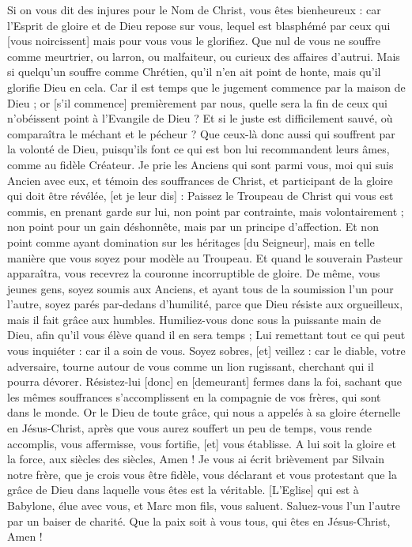 \begin{multicols}{2}
Si on vous dit des injures pour le Nom de Christ, vous êtes bienheureux : car l'Esprit de gloire et de Dieu repose sur vous, lequel est blasphémé par ceux qui [vous noircissent] mais pour vous vous le glorifiez.
Que nul de vous ne souffre comme meurtrier, ou larron, ou malfaiteur, ou curieux des affaires d'autrui.
Mais si quelqu'un souffre comme Chrétien, qu'il n'en ait point de honte, mais qu'il glorifie Dieu en cela.
Car il est temps que le jugement commence par la maison de Dieu ; or [s'il commence] premièrement par nous, quelle sera la fin de ceux qui n'obéissent point à l'Evangile de Dieu ?
Et si le juste est difficilement sauvé, où comparaîtra le méchant et le pécheur ?
Que ceux-là donc aussi qui souffrent par la volonté de Dieu, puisqu'ils font ce qui est bon lui recommandent leurs âmes, comme au fidèle Créateur.
\VerseOne{}Je prie les Anciens qui sont parmi vous, moi qui suis Ancien avec eux, et témoin des souffrances de Christ, et participant de la gloire qui doit être révélée, [et je leur dis] :
Paissez le Troupeau de Christ qui vous est commis, en prenant garde sur lui, non point par contrainte, mais volontairement ; non point pour un gain déshonnête, mais par un principe d'affection.
Et non point comme ayant domination sur les héritages [du Seigneur], mais en telle manière que vous soyez pour modèle au Troupeau.
Et quand le souverain Pasteur apparaîtra, vous recevrez la couronne incorruptible de gloire.
De même, vous jeunes gens, soyez soumis aux Anciens, et ayant tous de la soumission l'un pour l'autre, soyez parés par-dedans d'humilité, parce que Dieu résiste aux orgueilleux, mais il fait grâce aux humbles.
Humiliez-vous donc sous la puissante main de Dieu, afin qu'il vous élève quand il en sera temps ;
Lui remettant tout ce qui peut vous inquiéter : car il a soin de vous.
Soyez sobres, [et] veillez : car le diable, votre adversaire, tourne autour de vous comme un lion rugissant, cherchant qui il pourra dévorer.
Résistez-lui [donc] en [demeurant] fermes dans la foi, sachant que les mêmes souffrances s'accomplissent en la compagnie de vos frères, qui sont dans le monde.
Or le Dieu de toute grâce, qui nous a appelés à sa gloire éternelle en Jésus-Christ, après que vous aurez souffert un peu de temps, vous rende accomplis, vous affermisse, vous fortifie, [et] vous établisse.
A lui soit la gloire et la force, aux siècles des siècles, Amen !
Je vous ai écrit brièvement par Silvain notre frère, que je crois vous être fidèle, vous déclarant et vous protestant que la grâce de Dieu dans laquelle vous êtes est la véritable.
[L'Eglise] qui est à Babylone, élue avec vous, et Marc mon fils, vous saluent.
Saluez-vous l'un l'autre par un baiser de charité. Que la paix soit à vous tous, qui êtes en Jésus-Christ, Amen !
\PPE{}
\end{multicols}
